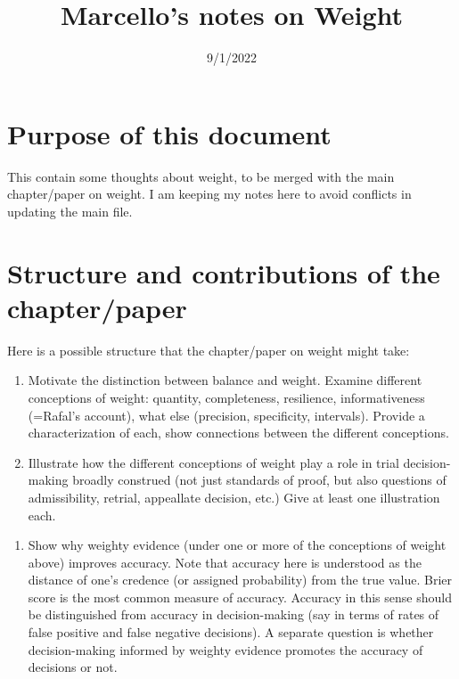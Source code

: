 \documentclass[
  10pt,
  dvipsnames,enabledeprecatedfontcommands]{scrartcl}
\title{Marcello's notes on Weight}
\author{}
\date{\vspace{-2.5em}9/1/2022}
\providecommand{\tightlist}{%
  \setlength{\itemsep}{0pt}\setlength{\parskip}{0pt}}
\begin{document}
\maketitle

\hypertarget{purpose-of-this-document}{%
\section{Purpose of this document}\label{purpose-of-this-document}}

This contain some thoughts about weight, to be merged with the main
chapter/paper on weight. I am keeping my notes here to avoid conflicts
in updating the main file.

\hypertarget{structure-and-contributions-of-the-chapterpaper}{%
\section{Structure and contributions of the
chapter/paper}\label{structure-and-contributions-of-the-chapterpaper}}

Here is a possible structure that the chapter/paper on weight might
take:

\begin{enumerate}
\def\labelenumi{(\arabic{enumi})}
\item
  Motivate the distinction between balance and weight. Examine different
  conceptions of weight: quantity, completeness, resilience,
  informativeness (=Rafal's account), what else (precision, specificity,
  intervals). Provide a characterization of each, show connections
  between the different conceptions.
\item
  Illustrate how the different conceptions of weight play a role in
  trial decision-making broadly construed (not just standards of proof,
  but also questions of admissibility, retrial, appeallate decision,
  etc.) Give at least one illustration each.
\end{enumerate}


\begin{enumerate}
\def\labelenumi{(\arabic{enumi})}
\setcounter{enumi}{2}
\tightlist
\item
  Show why weighty evidence (under one or more of the conceptions of
  weight above) improves accuracy. Note that accuracy here is understood
  as the distance of one's credence (or assigned probability) from the
  true value. Brier score is the most common measure of accuracy.
  Accuracy in this sense should be distinguished from accuracy in
  decision-making (say in terms of rates of false positive and false
  negative decisions). A separate question is whether decision-making
  informed by weighty evidence promotes the accuracy of decisions or
  not.
\end{enumerate}
\end{document}
